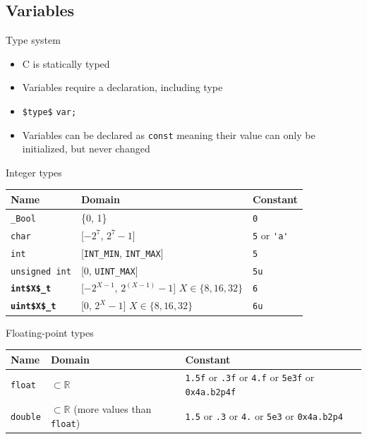 \documentclass[english,compress]{beamer}
\begin{document}
\subsection{Variables}
\begin{frame}{Type system}
	\begin{itemize}
		\item C is statically typed
		\item Variables require a declaration, including type
		\item {\color{blue}\lstinline|$type$|} \lstinline|var;|
		\item Variables can be declared as \lstinline|const| meaning
			their value can only be initialized, but never changed
	\end{itemize}
\end{frame}

\begin{frame}{Integer types}
	\begin{table}
		\centering
		\begin{tabular}{l|l|l}
			Name & Domain & Constant \\
			\hline
			\lstinline|_Bool| & \{0, 1\} & \lstinline|0| \\
			\lstinline|char| & [$-2^7$, $2^7-1$] & \lstinline|5| or \lstinline|'a'| \\
			\lstinline|int| & [\lstinline|INT_MIN|, \lstinline|INT_MAX|] & \lstinline|5| \\
			\lstinline|unsigned int| & [0, \lstinline|UINT_MAX|] & \lstinline|5u| \\
			{\color{blue}\bf\lstinline|int$X$_t|} & [$-2^{X-1}$, $2^{(X-1)}-1$] $ X \in \{8, 16, 32\}$ & \lstinline|6| \\
			{\color{blue}\bf\lstinline|uint$X$_t|} & [0, $2^X-1$] $ X \in \{8, 16, 32\}$ & \lstinline|6u|
		\end{tabular}
	\end{table}
\end{frame}

\begin{frame}{Floating-point types}
	\begin{table}
		\centering
		\begin{tabular}{l|l|p{}}
			Name & Domain & Constant \\
			\hline
			\lstinline|float| & $\subset \mathbb{R}$ & \lstinline|1.5f| or \lstinline|.3f| or \lstinline|4.f| or \lstinline|5e3f| or \lstinline|0x4a.b2p4f| \\
			\lstinline|double| & $\subset \mathbb{R}$ (more values than \lstinline|float|) & \lstinline|1.5| or \lstinline|.3| or \lstinline|4.| or \lstinline|5e3| or \lstinline|0x4a.b2p4|
		\end{tabular}
	\end{table}
\end{frame}
\end{document}
